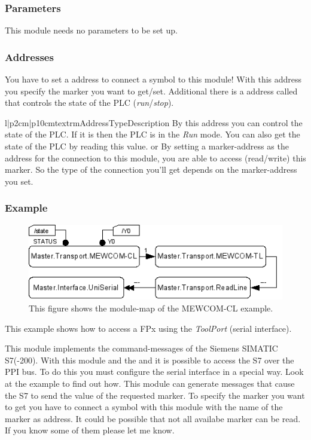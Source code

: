 \subsubsection{Parameters}
This module needs no parameters to be set up.

\subsubsection{Addresses}
You have to set a address to connect a symbol to this module! With this 
address you specify the marker you want to get/set. Additional there is a
address called  that controls the state of the PLC 
(\emph{run}/\emph{stop}).
\begin{tableiii}{l|p{2cm}|p{10cm}}{textrm}{Address}{Type}{Description}
        {}
        {By this address you can control the state of the PLC. If it is 
          then the PLC is in the \emph{Run} mode. You can also
         get the state of the PLC by reading this value.}
        { or
         }
        {By setting a marker-address as the address for the connection to this 
         module, you are able to access (read/write) this marker. So the type 
         of the connection you'll get depends on the marker-address you set.} 
\end{tableiii}

\subsubsection{Example}
\begin{figure}[ht]
    \label{fig:coremod11}
    \centering
    \includegraphics{coremod11.png}
    \caption{This figure shows the module-map of the MEWCOM-CL example.}
\end{figure}    
This example shows how to access a FPx using the \emph{ToolPort} (serial interface).





%
%
This module implements the command-messages of the Siemens SIMATIC S7(-200). 
With this module and the  and 
 it is possible to access the S7 over the 
PPI bus. To do this you must configure the serial interface in a special way. 
Look at the example to find out how. This module can generate messages that 
cause the S7 to send the value of the requested marker. To specify the marker 
you want to get you have to connect a symbol with this module with the name of
the marker as address. It could be possible that not all availabe marker can be
read. If you know some of them please let me know.

